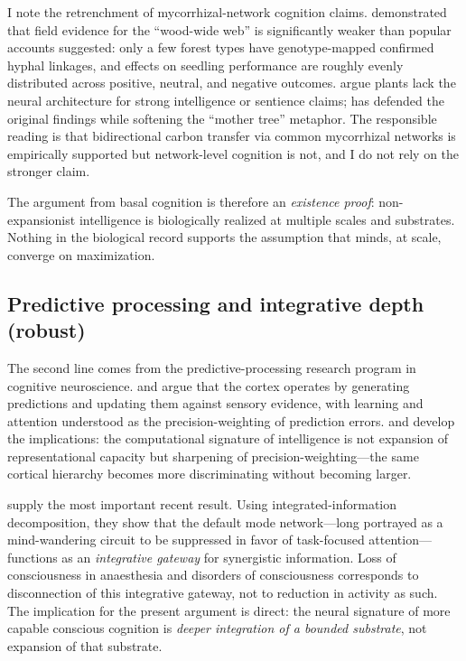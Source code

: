 \documentclass[11pt,a4paper,twocolumn]{article}
\begin{document}
I note the retrenchment of mycorrhizal-network cognition claims.
\citet{karst2023} demonstrated that field evidence for the ``wood-wide
web'' is significantly weaker than popular accounts suggested: only a
few forest types have genotype-mapped confirmed hyphal linkages, and
effects on seedling performance are roughly evenly distributed across
positive, neutral, and negative outcomes. \citet{robinson2024} argue
plants lack the neural architecture for strong intelligence or sentience
claims; \citet{simard2025} has defended the original findings while
softening the ``mother tree'' metaphor. The responsible reading is that
bidirectional carbon transfer via common mycorrhizal networks is
empirically supported but network-level cognition is not, and I do not
rely on the stronger claim.

The argument from basal cognition is therefore an \emph{existence proof}:
non-expansionist intelligence is biologically realized at multiple scales
and substrates. Nothing in the biological record supports the assumption
that minds, at scale, converge on maximization.

\subsection{Predictive processing and integrative depth (robust)}

The second line comes from the predictive-processing research program in
cognitive neuroscience. \citet{clark2013} and \citet{friston2010} argue
that the cortex operates by generating predictions and updating them
against sensory evidence, with learning and attention understood as the
precision-weighting of prediction errors. \citet{clark2016} and
\citet{hohwy2013} develop the implications: the computational signature
of intelligence is not expansion of representational capacity but
sharpening of precision-weighting---the same cortical hierarchy becomes
more discriminating without becoming larger.

\citet{luppi2024} supply the most important recent result. Using
integrated-information decomposition, they show that the default mode
network---long portrayed as a mind-wandering circuit to be suppressed
in favor of task-focused attention---functions as an \emph{integrative
gateway} for synergistic information. Loss of consciousness in anaesthesia
and disorders of consciousness corresponds to disconnection of this
integrative gateway, not to reduction in activity as such. The
implication for the present argument is direct: the neural signature
of more capable conscious cognition is \emph{deeper integration of a
bounded substrate}, not expansion of that substrate.
\end{document}

